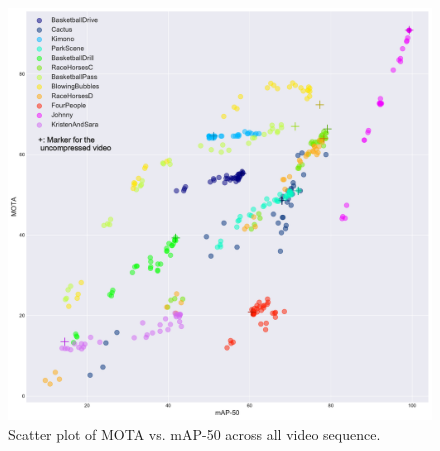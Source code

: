 \begin{figure}[!tb]
  \centering
  \includegraphics[width=0.8\linewidth]{img/MOTA_vs_mAP50.pdf}
  \caption[Scatter plot of MOTA vs. mAP-50 across all video sequences]
  {Scatter plot of MOTA vs. mAP-50 across all video sequence.}
  \label{fig:MOTA_vs_mAP50}
\end{figure}